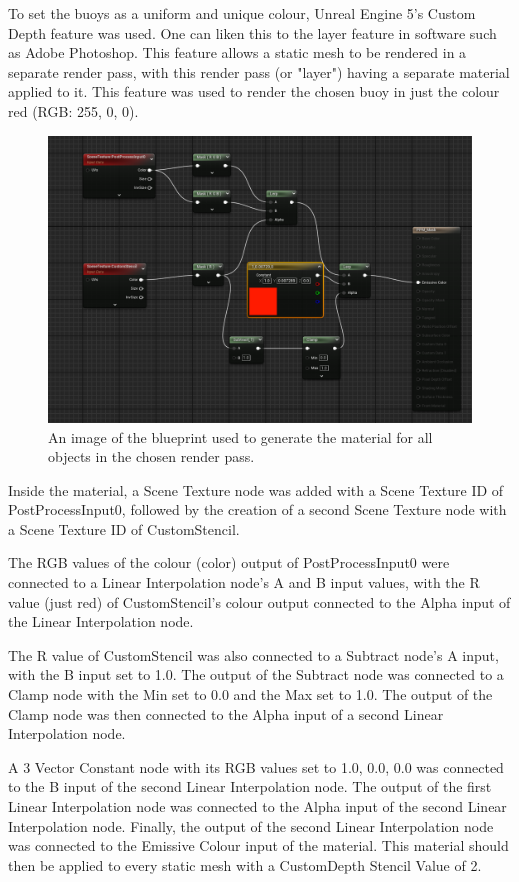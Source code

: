 \documentclass[10pt,twocolumn,letterpaper]{article}
\begin{document}
To set the buoys as a uniform and unique colour, Unreal Engine 5's Custom Depth feature was used. One can liken this to the layer feature in software such as Adobe Photoshop. This feature allows a static mesh to be rendered in a separate render pass, with this render pass (or "layer") having a separate material applied to it.  This feature was used to render the chosen buoy in just the colour red (RGB: 255, 0, 0).

\begin{figure}[t]
    \centering
    \includegraphics[width=\linewidth]{images/ppm_mask.png}
    \caption{An image of the blueprint used to generate the material for all objects in the chosen render pass.}
    \label{fig:ppm_mask}
\end{figure}

Inside the material, a Scene Texture node was added with a Scene Texture ID of PostProcessInput0, followed by the creation of a second Scene Texture node with a Scene Texture ID of CustomStencil.

The RGB values of the colour (color) output of PostProcessInput0 were connected to a Linear Interpolation node's A and B input values, with the R value (just red) of CustomStencil's colour output connected to the Alpha input of the Linear Interpolation node.

The R value of CustomStencil was also connected to a Subtract node's A input, with the B input set to 1.0. The output of the Subtract node was connected to a Clamp node with the Min set to 0.0 and the Max set to 1.0. The output of the Clamp node was then connected to the Alpha input of a second Linear Interpolation node.

A 3 Vector Constant node with its RGB values set to 1.0, 0.0, 0.0 was connected to the B input of the second Linear Interpolation node. The output of the first Linear Interpolation node was connected to the Alpha input of the second Linear Interpolation node. Finally, the output of the second Linear Interpolation node was connected to the Emissive Colour input of the material. This material should then be applied to every static mesh with a CustomDepth Stencil Value of 2.
\end{document}

